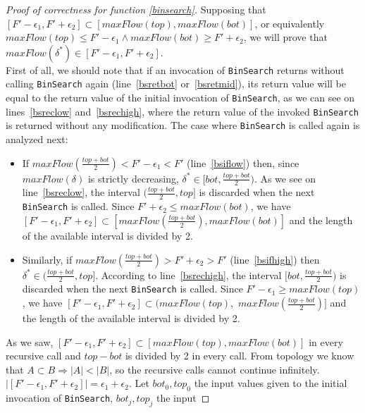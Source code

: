 \begin{proof}[Proof of correctness for function \ref{binsearch}]
   Supposing that $[F' - \epsilon_1, F' + \epsilon_2] \subset [maxFlow(top),maxFlow(bot)]$, or equivalently
   $maxFlow(top) \leq F' - \epsilon_1 \wedge maxFlow(bot) \geq F' + \epsilon_2$, we will prove that
   $maxFlow(\delta^*) \in [F' - \epsilon_1, F' + \epsilon_2]$. \\
   First of all, we should note that if an invocation of \texttt{BinSearch} returns without calling \texttt{BinSearch}
   again (line~\ref{bsretbot} or~\ref{bsretmid}), its return value will be equal to the return value of the initial
   invocation of \texttt{BinSearch}, as we can see on lines~\ref{bsreclow} and~\ref{bsrechigh}, where the return value of
   the invoked \texttt{BinSearch} is returned without any modification. The case where \texttt{BinSearch} is called again
   is analyzed next:
   \begin{itemize}
      \item If $maxFlow(\frac{top+bot}{2}) < F' - \epsilon_1 < F'$ (line~\ref{bsiflow}) then, since $maxFlow(\delta)$ is
      strictly decreasing, $\delta^* \in [bot,\frac{top+bot}{2})$. As we see on line~\ref{bsreclow}, the interval
      $(\frac{top+bot}{2}, top]$ is discarded when the next \texttt{BinSearch} is called. Since $F' + \epsilon_2 \leq
      maxFlow(bot)$, we have $[F' - \epsilon_1, F' + \epsilon_2] \subset [maxFlow(\frac{top+bot}{2}), maxFlow(bot)]$ and
      the length of the available interval is divided by 2.
      \item Similarly, if $maxFlow(\frac{top+bot}{2}) > F' + \epsilon_2 > F'$ (line~\ref{bsifhigh}) then $\delta^* \in
      (\frac{top+bot}{2}, top]$. According to line~\ref{bsrechigh}, the interval $[bot, \frac{top+bot}{2})$ is discarded
      when the next \texttt{BinSearch} is called. Since $F'- \epsilon_1 \geq maxFlow(top)$, we have $[F' - \epsilon_1, F'
      + \epsilon_2] \subset (maxFlow(top),$ $maxFlow(\frac{top+bot}{2})]$ and the length of the available interval is
      divided by 2.
   \end{itemize}
   As we saw, $[F' - \epsilon_1, F' + \epsilon_2] \subset [maxFlow(top),maxFlow(bot)]$ in every recursive call and
   $top - bot$ is divided by 2 in every call. From topology we know that $A \subset B \Rightarrow |A| < |B|$, so the
   recursive calls cannot continue infinitely. $|[F' - \epsilon_1, F' + \epsilon_2]| = \epsilon_1 + \epsilon_2$. Let
   $bot_0, top_0$ the input values given to the initial invocation of \texttt{BinSearch}, $bot_j,top_j$ the input

\end{proof}
